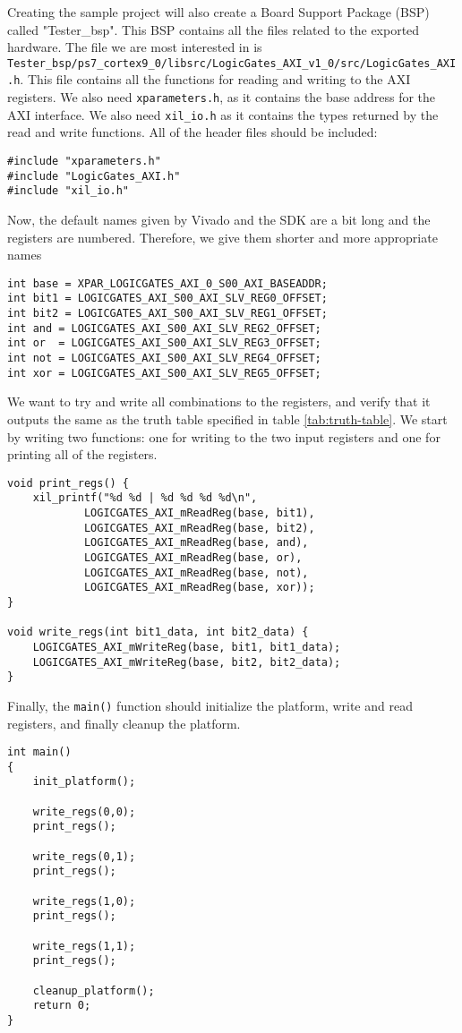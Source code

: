 Creating the sample project will also create a Board
Support Package (BSP) called "Tester\_bsp". This BSP contains all the files related to the exported
hardware. The file we are most interested in is
\texttt{Tester\_bsp/ps7\_cortex9\_0/libsrc/LogicGates\_AXI\_v1\_0/src/LogicGates\_AXI.h}.
This file contains all the functions for reading and writing to the AXI
registers. We also need \texttt{xparameters.h}, as it contains the base address
for the AXI interface. We also need \texttt{xil\_io.h} as it contains
the types returned by the read and write functions. All of the header files
should be included:
\begin{lstlisting}
#include "xparameters.h"
#include "LogicGates_AXI.h"
#include "xil_io.h"
\end{lstlisting}
Now, the default names given by Vivado and the SDK are a bit long and the
registers are numbered. Therefore, we give them shorter and more appropriate
names
\begin{lstlisting}
int base = XPAR_LOGICGATES_AXI_0_S00_AXI_BASEADDR;
int bit1 = LOGICGATES_AXI_S00_AXI_SLV_REG0_OFFSET;
int bit2 = LOGICGATES_AXI_S00_AXI_SLV_REG1_OFFSET;
int and = LOGICGATES_AXI_S00_AXI_SLV_REG2_OFFSET;
int or  = LOGICGATES_AXI_S00_AXI_SLV_REG3_OFFSET;
int not = LOGICGATES_AXI_S00_AXI_SLV_REG4_OFFSET;
int xor = LOGICGATES_AXI_S00_AXI_SLV_REG5_OFFSET;
\end{lstlisting}
We want to try and write all combinations to the registers, and verify that it
outputs the same as the truth table specified in table \ref{tab:truth-table}. We start by
writing two functions: one for writing to the two input registers and one for
printing all of the registers.
\begin{lstlisting}
void print_regs() {
    xil_printf("%d %d | %d %d %d %d\n",
            LOGICGATES_AXI_mReadReg(base, bit1),
            LOGICGATES_AXI_mReadReg(base, bit2),
            LOGICGATES_AXI_mReadReg(base, and),
            LOGICGATES_AXI_mReadReg(base, or),
            LOGICGATES_AXI_mReadReg(base, not),
            LOGICGATES_AXI_mReadReg(base, xor));
}

void write_regs(int bit1_data, int bit2_data) {
    LOGICGATES_AXI_mWriteReg(base, bit1, bit1_data);
    LOGICGATES_AXI_mWriteReg(base, bit2, bit2_data);
}
\end{lstlisting}
Finally, the \texttt{main()} function should initialize the platform, write and
read registers, and finally cleanup the platform.
\begin{lstlisting}
int main()
{
    init_platform();

    write_regs(0,0);
    print_regs();

    write_regs(0,1);
    print_regs();

    write_regs(1,0);
    print_regs();

    write_regs(1,1);
    print_regs();

    cleanup_platform();
    return 0;
}
\end{lstlisting}
